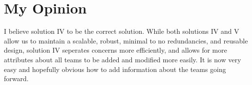 \documentclass{article}
\begin{document}
\section{My Opinion}  I believe solution IV to be the correct solution. While both solutions IV and V allow us to maintain a scalable, robust, minimal to no redundancies, and reusable design, solution IV seperates concerns more efficiently, and allows for more attributes about all teams to be added and modified more easily. It is now very easy and hopefully obvious how to add information about the teams going forward.
\end{document}
